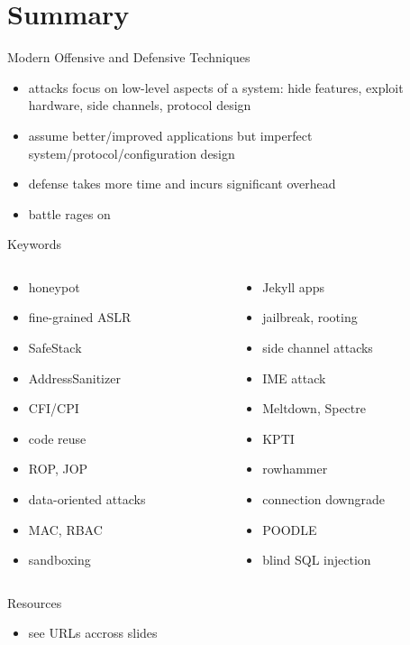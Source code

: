 \documentclass{curs}
\begin{document}
\section{Summary}

\begin{frame}{Modern Offensive and Defensive Techniques}
  \begin{itemize}
    \pause \item attacks focus on low-level aspects of a system: hide features, exploit hardware, side channels, protocol design
    \pause \item assume better/improved applications but imperfect system/protocol/configuration design
    \pause \item defense takes more time and incurs significant overhead
    \pause \item battle rages on
  \end{itemize}
\end{frame}

\begin{frame}{Keywords}
  \begin{columns}
    \begin{column}{0.5\textwidth}
      \begin{itemize}
        \item honeypot
        \item fine-grained ASLR
        \item SafeStack
        \item AddressSanitizer
        \item CFI/CPI
        \item code reuse
        \item ROP, JOP
        \item data-oriented attacks
        \item MAC, RBAC
        \item sandboxing
      \end{itemize}
    \end{column}
    \begin{column}{0.5\textwidth}
      \begin{itemize}
        \item Jekyll apps
        \item jailbreak, rooting
        \item side channel attacks
        \item IME attack
        \item Meltdown, Spectre
        \item KPTI
        \item rowhammer
        \item connection downgrade
        \item POODLE
        \item blind SQL injection
      \end{itemize}
    \end{column}
  \end{columns}
\end{frame}

\begin{frame}{Resources}
  \begin{itemize}
    \item see URLs accross slides
  \end{itemize}
\end{frame}
\end{document}
